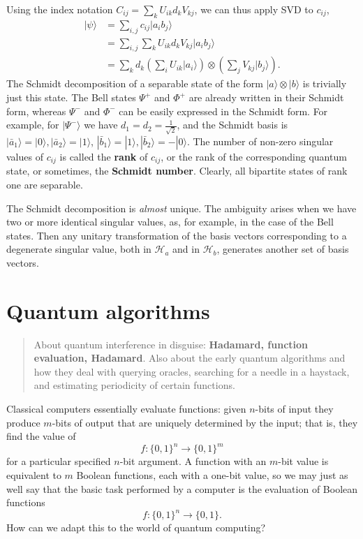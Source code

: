 \documentclass[fleqn]{article}
\let\oldsection\section
\renewcommand\section{\clearpage\oldsection}
\begin{document}
Using the index notation \(C_{ij} = \sum_k U_{ik}d_k V_{kj}\), we can thus apply SVD to \(c_{ij}\),
\[
  \begin{aligned}
    |\psi\rangle
    &= \sum_{i,j} c_{ij}|a_ib_j\rangle
  \\&= \sum_{i,j} \sum_k U_{ik}d_k V_{kj}|a_ib_j\rangle
  \\&= \sum_k d_k \left(\sum_i U_{ik}|a_i\rangle\right)\otimes\left(\sum_j V_{kj}|b_j\rangle\right).
  \end{aligned}
\]
The Schmidt decomposition of a separable state of the form
\(|a\rangle\otimes|b\rangle\) is trivially just this state.
The Bell states \(\Psi^+\) and \(\Phi^+\) are already written in their Schmidt form, whereas \(\Psi^-\) and \(\Phi^-\) can be easily expressed in the Schmidt form.
For example, for \(|\Psi^-\rangle\) we have \(d_1 = d_2 = \frac{1}{\sqrt 2}\), and the Schmidt basis is \(|\bar a_1\rangle =|0\rangle, |\bar a_2\rangle=|1\rangle\), \(|\bar b_1\rangle = |1\rangle, |\bar b_2\rangle=-|0\rangle\).
The number of non-zero singular values of \(c_{ij}\) is called the \textbf{rank} of \(c_{ij}\), or the rank of the corresponding quantum state, or sometimes, the \textbf{Schmidt number}.
Clearly, all bipartite states of rank one are separable.

The Schmidt decomposition is \emph{almost} unique.
The ambiguity arises when we have two or more identical singular values, as, for example, in the case of the Bell states.
Then any unitary transformation of the basis vectors corresponding to a degenerate singular value, both in \(\mathcal{H}_a\) and in \(\mathcal{H}_b\), generates another set of basis vectors.

\hypertarget{chapter6}{%
\section{Quantum algorithms}\label{chapter6}}

\begin{quote}
About quantum interference in disguise: \textbf{Hadamard, function evaluation, Hadamard}.
Also about the early quantum algorithms and how they deal with querying oracles, searching for a needle in a haystack, and estimating periodicity of certain functions.
\end{quote}

Classical computers essentially evaluate functions: given \(n\)-bits of input they produce \(m\)-bits of output that are uniquely determined by the input; that is, they find the value of
\[
  f\colon \{0,1\}^n \to \{0,1\}^m
\]
for a particular specified \(n\)-bit argument.
A function with an \(m\)-bit value is equivalent to \(m\) Boolean functions, each with a one-bit value, so we may just as well say that the basic task performed by a computer is the evaluation of Boolean functions
\[
  f\colon \{0,1\}^n \to  \{0,1\}.
\]
How can we adapt this to the world of quantum computing?
\end{document}
